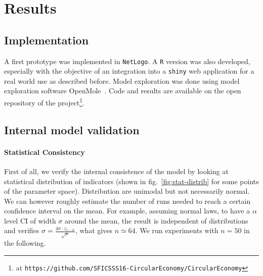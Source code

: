 \documentclass[fleqn,10pt]{wlscirep}
\begin{document}
{%











\section*{Results}






\subsection*{Implementation}

A first prototype was implemented in \texttt{NetLogo}. A \texttt{R} version was also developed, especially with the objective of an integration into a \texttt{shiny} web application for a real world use as described before. Model exploration was done using model exploration software OpenMole~\cite{reuillon2013openmole}. Code and results are available on the open repository of the project\footnote{at \texttt{https://github.com/SFICSSS16-CircularEconomy/CircularEconomy}}.




\subsection*{Internal model validation}


\paragraph*{Statistical Consistency}

First of all, we verify the internal consistence of the model by looking at statistical distribution of indicators (shown in fig.~\ref{fig:stat-distrib} for some points of the parameter space). Distribution are unimodal but not necessarily normal. We can however roughly estimate the number of runs needed to reach a certain confidence interval on the mean. For example, assuming normal laws, to have a $\alpha$ level CI of width $\sigma$ around the mean, the result is independent of distributions and verifies $\sigma = \frac{4\sigma \cdot z_{1-\alpha}}{\sqrt{n}}$, what gives $n\simeq 64$. We run experiments with $n=50$ in the following.


}
\end{document}
